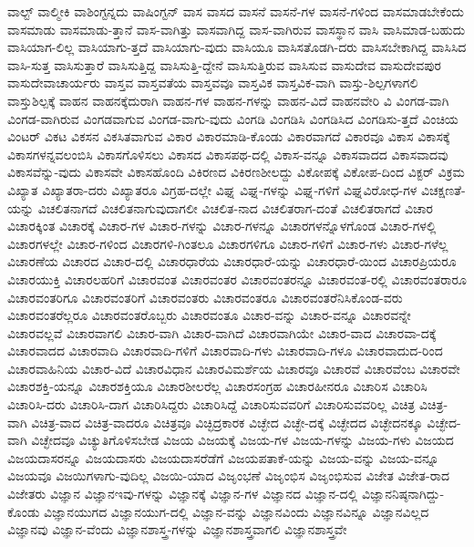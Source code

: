 {ವಾಲ್ಟ್
ವಾಲ್ಮೀಕಿ
ವಾಶಿಂಗ್ಟನ್ನದು
ವಾಷಿಂಗ್ಟನ್
ವಾಸ
ವಾಸದ
ವಾಸನೆ
ವಾಸನೆ-ಗಳ
ವಾಸನೆ-ಗಳಿಂದ
ವಾಸಮಾಡಬೇಕೆಂದು
ವಾಸಮಾಡು
ವಾಸಮಾಡು-ತ್ತಾನೆ
ವಾಸ-ವಾಗಿತ್ತು
ವಾಸವಾಗಿದ್ದ
ವಾಸ-ವಾಗಿರುವ
ವಾಸಸ್ಥಾನ
ವಾಸಿ
ವಾಸಿಮಾಡ-ಬಹುದು
ವಾಸಿಯಾಗ-ಲಿಲ್ಲ
ವಾಸಿಯಾಗು-ತ್ತದೆ
ವಾಸಿಯಾಗು-ವುದು
ವಾಸಿಯೂ
ವಾಸಿಸತೊಡಗಿ-ದರು
ವಾಸಿಸಬೇಕಾಗಿದ್ದ
ವಾಸಿಸಿದ
ವಾಸಿ-ಸುತ್ತ
ವಾಸಿಸುತ್ತಾರೆ
ವಾಸಿಸುತ್ತಿದ್ದ
ವಾಸಿಸುತ್ತಿ-ದ್ದೇನೆ
ವಾಸಿಸುತ್ತಿರುವ
ವಾಸಿಸುವ
ವಾಸುದೇವ
ವಾಸುದೇವಪುರ
ವಾಸುದೇವಾಚಾರ್ಯರು
ವಾಸ್ತವ
ವಾಸ್ತವತೆಯ
ವಾಸ್ತವವೂ
ವಾಸ್ತವಿಕ
ವಾಸ್ತವಿಕ-ವಾಗಿ
ವಾಸ್ತು-ಶಿಲ್ಪಗಳಾಗಲಿ
ವಾಸ್ತುಶಿಲ್ಪಕ್ಕೆ
ವಾಹನ
ವಾಹನಕ್ಕೆದುರಾಗಿ
ವಾಹನ-ಗಳ
ವಾಹನ-ಗಳನ್ನು
ವಾಹನ-ವಿದೆ
ವಾಹನವೇರಿ
ವಿ
ವಿಂಗಡ-ವಾಗಿ
ವಿಂಗಡ-ವಾಗಿರುವ
ವಿಂಗಡವಾಗುವ
ವಿಂಗಡ-ವಾಗು-ವುದು
ವಿಂಗಡಿ
ವಿಂಗಡಿಸಿ
ವಿಂಗಡಿಸಿದ
ವಿಂಗಡಿಸು-ತ್ತದೆ
ವಿಂಚಿಯ
ವಿಂಟರ್
ವಿಕಟ
ವಿಕಸನ
ವಿಕಸಿತವಾಗುವ
ವಿಕಾರ
ವಿಕಾರಮಾಡಿ-ಕೊಂಡು
ವಿಕಾರವಾಗದೆ
ವಿಕಾರವೂ
ವಿಕಾಸ
ವಿಕಾಸಕ್ಕೆ
ವಿಕಾಸಗಳನ್ನವಲಂಬಿಸಿ
ವಿಕಾಸಗೊಳಿಸಲು
ವಿಕಾಸದ
ವಿಕಾಸಪಥ-ದಲ್ಲಿ
ವಿಕಾಸ-ವನ್ನೂ
ವಿಕಾಸವಾದದ
ವಿಕಾಸವಾದವು
ವಿಕಾಸವೆನ್ನು-ವುದು
ವಿಕಾಸವೇ
ವಿಕಾಸಹೊಂದಿ
ವಿಕಿರಣದ
ವಿಕಿರಣಶೀಲದ್ದು
ವಿಕೋಪಕ್ಕೆ
ವಿಕೋಪ-ದಿಂದ
ವಿಕ್ಟರ್
ವಿಕ್ರಮ
ವಿಖ್ಯಾತ
ವಿಖ್ಯಾತರಾ-ದರು
ವಿಖ್ಯಾತರೂ
ವಿಗ್ರಹ-ದಲ್ಲೇ
ವಿಘ್ನ
ವಿಘ್ನ-ಗಳನ್ನು
ವಿಘ್ನ-ಗಳಿಗೆ
ವಿಘ್ನವಿರೋಧ-ಗಳ
ವಿಚಕ್ಷಣತೆ-ಯನ್ನು
ವಿಚಲಿತನಾಗದೆ
ವಿಚಲಿತನಾಗುವುದಾಗಲೀ
ವಿಚಲಿತ-ನಾದ
ವಿಚಲಿತರಾಗ-ದಂತೆ
ವಿಚಲಿತರಾಗದೆ
ವಿಚಾರ
ವಿಚಾರಕ್ಕಿಂತ
ವಿಚಾರಕ್ಕೆ
ವಿಚಾರ-ಗಳ
ವಿಚಾರ-ಗಳನ್ನು
ವಿಚಾರ-ಗಳನ್ನೂ
ವಿಚಾರಗಳನ್ನೊಳಗೊಂಡ
ವಿಚಾರ-ಗಳಲ್ಲಿ
ವಿಚಾರಗಳಲ್ಲೇ
ವಿಚಾರ-ಗಳಿಂದ
ವಿಚಾರಗಳಿ-ಗಿಂತಲೂ
ವಿಚಾರಗಳಿಗೂ
ವಿಚಾರ-ಗಳಿಗೆ
ವಿಚಾರ-ಗಳು
ವಿಚಾರ-ಗಳೆಲ್ಲ
ವಿಚಾರಣೆಯ
ವಿಚಾರದ
ವಿಚಾರ-ದಲ್ಲಿ
ವಿಚಾರಧಾರೆಯ
ವಿಚಾರಧಾರೆ-ಯನ್ನು
ವಿಚಾರಧಾರೆ-ಯಿಂದ
ವಿಚಾರಪ್ರಿಯರೂ
ವಿಚಾರಯುಕ್ತಿ
ವಿಚಾರಲಹರಿಗೆ
ವಿಚಾರವಂತ
ವಿಚಾರವಂತರ
ವಿಚಾರವಂತರನ್ನೂ
ವಿಚಾರವಂತ-ರಲ್ಲಿ
ವಿಚಾರವಂತರಾರೂ
ವಿಚಾರವಂತರಿಗೂ
ವಿಚಾರವಂತರಿಗೆ
ವಿಚಾರವಂತರು
ವಿಚಾರವಂತರೂ
ವಿಚಾರವಂತರೆನಿಸಿಕೊಂಡ-ವರು
ವಿಚಾರವಂತರೆಲ್ಲರೂ
ವಿಚಾರವಂತರೊಬ್ಬರು
ವಿಚಾರವಂತೂ
ವಿಚಾರ-ವನ್ನು
ವಿಚಾರ-ವನ್ನೂ
ವಿಚಾರವನ್ನೇ
ವಿಚಾರವಲ್ಲವೆ
ವಿಚಾರವಾಗಲಿ
ವಿಚಾರ-ವಾಗಿ
ವಿಚಾರ-ವಾಗಿದೆ
ವಿಚಾರವಾಗಿಯೇ
ವಿಚಾರ-ವಾದ
ವಿಚಾರವಾ-ದಕ್ಕೆ
ವಿಚಾರವಾದದ
ವಿಚಾರವಾದಿ
ವಿಚಾರವಾದಿ-ಗಳಿಗೆ
ವಿಚಾರವಾದಿ-ಗಳು
ವಿಚಾರವಾದಿ-ಗಳೂ
ವಿಚಾರವಾದುದ-ರಿಂದ
ವಿಚಾರವಾಹಿನಿಯ
ವಿಚಾರ-ವಿದೆ
ವಿಚಾರವಿಧಾನ
ವಿಚಾರವಿಮರ್ಶೆಯ
ವಿಚಾರವೂ
ವಿಚಾರವೆ
ವಿಚಾರವೆಂಬ
ವಿಚಾರವೇ
ವಿಚಾರಶಕ್ತಿ-ಯನ್ನೂ
ವಿಚಾರಶಕ್ತಿಯೂ
ವಿಚಾರಶೀಲರೆಲ್ಲ
ವಿಚಾರಸಂಗ್ರಹ
ವಿಚಾರಹೀನರೂ
ವಿಚಾರಿಸ
ವಿಚಾರಿಸಿ
ವಿಚಾರಿಸಿ-ದರು
ವಿಚಾರಿಸಿ-ದಾಗ
ವಿಚಾರಿಸಿದ್ದರು
ವಿಚಾರಿಸಿದ್ದೆ
ವಿಚಾರಿಸುವವರಿಗೆ
ವಿಚಾರಿಸುವವರಿಲ್ಲ
ವಿಚಿತ್ರ
ವಿಚಿತ್ರ-ವಾಗಿ
ವಿಚಿತ್ರ-ವಾದ
ವಿಚಿತ್ರ-ವಾದರೂ
ವಿಚಿತ್ರವೂ
ವಿಚ್ಛಿದ್ರಕಾರಕ
ವಿಚ್ಛೇದ
ವಿಚ್ಛೇ-ದಕ್ಕೆ
ವಿಚ್ಛೇದದ
ವಿಚ್ಛೇದನಕ್ಕೂ
ವಿಚ್ಛೇದ-ವಾಗಿ
ವಿಚ್ಛೇದವೂ
ವಿಚ್ಯುತಿಗೊಳಿಸಬೇಡ
ವಿಜಯ
ವಿಜಯಕ್ಕೆ
ವಿಜಯ-ಗಳ
ವಿಜಯ-ಗಳನ್ನು
ವಿಜಯ-ಗಳು
ವಿಜಯದ
ವಿಜಯದಾಸರನ್ನೂ
ವಿಜಯದಾಸರು
ವಿಜಯದಾಸರೆಡೆಗೆ
ವಿಜಯಪತಾಕೆ-ಯನ್ನು
ವಿಜಯ-ವನ್ನು
ವಿಜಯ-ವನ್ನೂ
ವಿಜಯವೂ
ವಿಜಯಿಗಳಾಗು-ವುದಿಲ್ಲ
ವಿಜಯಿ-ಯಾದ
ವಿಜೃಂಭಣೆ
ವಿಜೃಂಭಿಸ
ವಿಜೃಂಭಿಸುವ
ವಿಜೇತ
ವಿಜೇತ-ರಾದ
ವಿಜೇತರು
ವಿಜ್ಞಾನ
ವಿಜ್ಞಾನಇವು-ಗಳನ್ನು
ವಿಜ್ಞಾನಕ್ಕೆ
ವಿಜ್ಞಾನ-ಗಳ
ವಿಜ್ಞಾನದ
ವಿಜ್ಞಾನ-ದಲ್ಲಿ
ವಿಜ್ಞಾನನಿಷ್ಠನಾಗಿದ್ದು-ಕೊಂಡು
ವಿಜ್ಞಾನಯುಗದ
ವಿಜ್ಞಾನಯುಗ-ದಲ್ಲಿ
ವಿಜ್ಞಾನ-ವನ್ನು
ವಿಜ್ಞಾನವಿಂದು
ವಿಜ್ಞಾನವಿನ್ನೂ
ವಿಜ್ಞಾನವಿಲ್ಲದ
ವಿಜ್ಞಾನವು
ವಿಜ್ಞಾನ-ವೆಂದು
ವಿಜ್ಞಾನಶಾಸ್ತ್ರ-ಗಳನ್ನು
ವಿಜ್ಞಾನಶಾಸ್ತ್ರವಾಗಲಿ
ವಿಜ್ಞಾನಶಾಸ್ತ್ರವೇ
}
